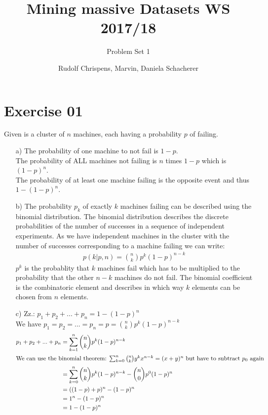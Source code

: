 \documentclass[11pt,a4paper]{scrartcl}
\title{Mining massive Datasets WS 2017/18}
\subtitle{Problem Set 1}
\author{Rudolf Chrispens, Marvin, Daniela Schacherer}
\begin{document}
	\section*{Exercise 01}
	Given is a cluster of $n$ machines, each having a probability $p$ of failing. 
	\begin{itemize}
		\item[a)] The probability of one machine to not fail is $1-p$. \\
		The probability of ALL machines not failing is $n$ times $1-p$ which is $(1-p)^n$. \\
		The probability of at least one machine failing is the opposite event and thus $1 - (1-p)^n$.
		\item[b)] The probability $p_k$ of exactly $k$ machines failing can be described using the binomial distribution. The binomial distribution describes the discrete probabilities of the number of successes in a sequence of independent experiments. As we have independent machines in the cluster with the number of successes corresponding to a machine failing we can write: \\
		\begin{align*}
			p(k|p,n) = {n\choose k} p^k (1-p)^{n-k}
		\end{align*}
		$p^k$ is the probablity that $k$ machines fail which has to be multiplied to the probability that the other $n-k$ machines do not fail. The binomial coefficient is the combinatoric element and describes in which way $k$ elements can be chosen from $n$ elements. 
		\item[c)] 
		Zz.: $p_1 + p_2 + ... + p_n = 1 - (1-p)^n$ \\
		We have $p_1 = p_2 = ... = p_n = p = {n \choose k} p^k (1-p)^{n-k}$
		\begin{align*}
			p_1 + p_2 + ... + p_n &= \sum_{k=1}^n {n \choose k} p^k (1-p)^{n-k} \\
			\intertext{We can use the binomial theorem: $\sum_{k=0}^n {n\choose k} y^k x^{n-k} = (x+y)^n$ but have to subtract $p_0$ again}
			&=  \sum_{k=0}^n {n \choose k} p^k (1-p)^{n-k} - {n \choose 0} p^0 (1-p)^n \\
			&= ((1-p) + p)^n - (1-p)^n	\\		
			&= 1^n - (1-p)^ n \\
			&= 1-(1-p)^n			
		\end{align*}
	\end{itemize}
	
\end{document}
